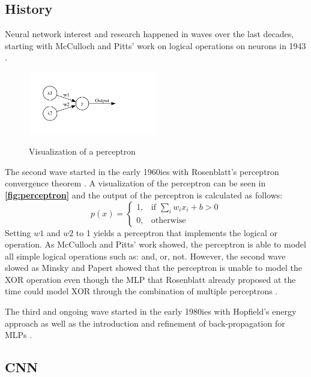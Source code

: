 \documentclass[10pt]{book}
\newcommand{\figureref}[1]{\textbf{\autoref{#1}}}
\begin{document}
\subsection{History}

Neural network interest and research happened in waves over the last decades, starting with McCulloch and Pitts' work on logical operations on neurons in 1943 \cite{mcculloch1943logical,485891}. 

\begin{figure}
  \caption{Visualization of a perceptron}
  \includegraphics[width=0.5\textwidth]{graph/rosenblatt}
  \label{fig:perceptron}
\end{figure}

The second wave started in the early 1960ies with Rosenblatt's perceptron convergence theorem \cite{rosenblatt1962principles}. A visualization of the perceptron can be seen in \figureref{fig:perceptron} and the output of the perceptron is calculated as follows:
\[
    p(x)= 
\begin{cases}
    1, & \text{if } \sum_i w_ix_i + b > 0\\
    0, & \text{otherwise}
\end{cases}
\]
Setting $w1$ and $w2$ to 1 yields a perceptron that implements the logical or operation. As McCulloch and Pitts' work showed, the perceptron is able to model all simple logical operations such as: and, or, not. However, the second wave slowed as Minsky and Papert showed that the perceptron is unable to model the XOR operation \cite{minsky1969perceptron} even though the \ac{MLP} that Rosenblatt already proposed at the time could model XOR through the combination of multiple perceptrons \cite{schmidhuber2022annotated}.

The third and ongoing wave started in the early 1980ies with Hopfield's energy approach \cite{hopfield1982neural} as well as the introduction and refinement of back-propagation for \acp{MLP} \cite{werbos1974beyond,rumelhart1986parallel}.

\subsection{CNN}
\end{document}
